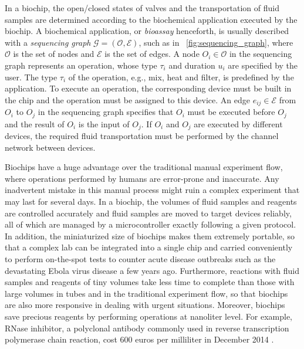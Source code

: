     In a biochip, the open/closed states of valves and the transportation of
fluid samples are determined according to the biochemical application executed by the
biochip. A biochemical application, or \textit{bioassay} henceforth,  
is usually described with
a \textit{sequencing graph} $\mathcal{G}=(\mathcal{O},\mathcal{E})$, such as in
\figname~\ref{fig:sequencing_graph}, where $\mathcal{O}$ is
the set of nodes %
and $\mathcal{E}$ is the set of edges. %
A node $O_i \in \mathcal{O}$ in the sequencing graph
represents an operation, whose type $\tau_i$ and duration $u_i$ are specified by the user.
The type $\tau_i$ of the operation, e.g., mix, heat and filter, is predefined by the application. 
To execute an operation, the corresponding device must be built in the chip
and the operation must be assigned to this device.
An edge $e_{ij}\in \mathcal{E}$ from $O_i$ to $O_j$
in the sequencing graph specifies that $O_i$ must be executed before $O_j$ and the 
result of $O_i$ is the input of $O_j$. If $O_i$ and $O_j$ are executed by
different devices, the required fluid transportation must be performed by the channel
network between devices. 

Biochips have a huge advantage over the traditional manual experiment
flow, where operations performed by humans are error-prone 
and inaccurate.  Any inadvertent mistake in this manual process 
might ruin a complex experiment that may
last for several days. In a biochip, the volumes of fluid samples and reagents are
controlled accurately and fluid samples are moved to target devices reliably,
all of which are managed
by a microcontroller exactly following a
given protocol.
In addition, the miniaturized size of biochips makes them
extremely portable, so that a complex lab can be integrated into a single chip
and carried conveniently to perform on-the-spot tests to counter acute 
disease outbreaks 
such as the devastating Ebola virus disease a few years ago.
Furthermore, reactions with fluid samples and reagents of tiny volumes
take less time to complete than those with large volumes in tubes and
in the traditional experiment flow, so that biochips are also more
responsive in dealing with urgent situations.
Moreover, %
biochips save precious reagents by performing operations at
nanoliter level. %
For example, RNase inhibitor, a polyclonal antibody
commonly used in reverse transcription polymerase chain reaction, cost 600 euros per milliliter in December 2014 
\cite{RNasePrice}. 

